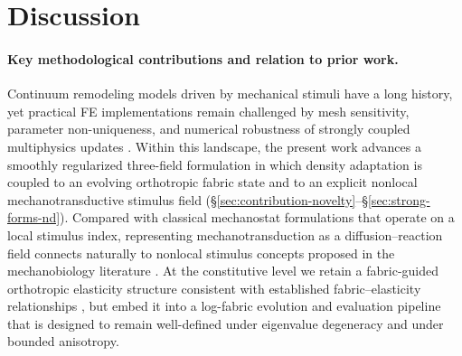 \section*{Discussion}
\label{sec:discussion}

\paragraph{Key methodological contributions and relation to prior work.}
Continuum remodeling models driven by mechanical stimuli have a long history, yet practical FE implementations remain challenged by mesh sensitivity, parameter non-uniqueness, and numerical robustness of strongly coupled multiphysics updates \cite{Weinans1992_BehaviorAdaptiveBoneRemodeling,Jacobs1995_NumericalInstabilitiesBone,Meslier2023_UsingFinite,MartinezReina2016_UniquenessBRM}.
Within this landscape, the present work advances a smoothly regularized three-field formulation in which density adaptation is coupled to an evolving orthotropic fabric state and to an explicit nonlocal mechanotransductive stimulus field (\S\ref{sec:contribution-novelty}--\S\ref{sec:strong-forms-nd}).
Compared with classical mechanostat formulations that operate on a local stimulus index, representing mechanotransduction as a diffusion--reaction field connects naturally to nonlocal stimulus concepts proposed in the mechanobiology literature \cite{Giorgio2019_MechanicallyDrivenBiological,Addessi2024_BoneRemodelingApproach}.
At the constitutive level we retain a fabric-guided orthotropic elasticity structure consistent with established fabric--elasticity relationships \cite{Cowin1985_RelationshipBetweenElasticity,Turner1990_FabricDependenceOrthotropic,Zysset1995_AlternativeModelAnisotropic}, but embed it into a log-fabric evolution and evaluation pipeline that is designed to remain well-defined under eigenvalue degeneracy and under bounded anisotropy.

